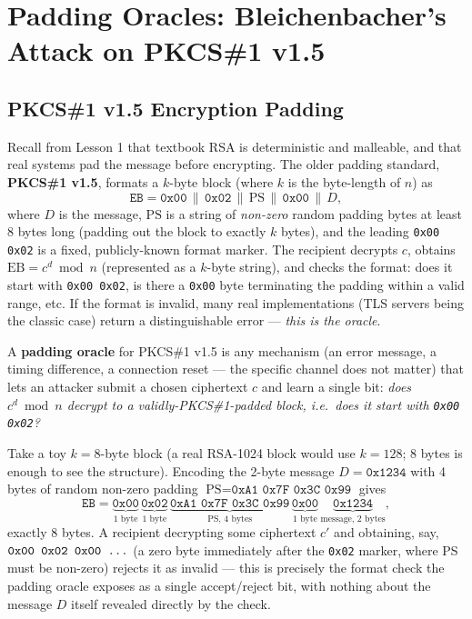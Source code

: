 \newpage
\section{Padding Oracles: Bleichenbacher's Attack on PKCS\#1 v1.5}

\subsection{PKCS\#1 v1.5 Encryption Padding}

Recall from Lesson 1 that textbook RSA is deterministic and malleable, and that real systems pad the message before encrypting. The older padding standard, \textbf{PKCS\#1 v1.5}, formats a $k$-byte block (where $k$ is the byte-length of $n$) as
\[
\texttt{EB} = \texttt{0x00} \,\|\, \texttt{0x02} \,\|\, \text{PS} \,\|\, \texttt{0x00} \,\|\, D,
\]
where $D$ is the message, $\text{PS}$ is a string of \emph{non-zero} random padding bytes at least 8 bytes long (padding out the block to exactly $k$ bytes), and the leading \texttt{0x00 0x02} is a fixed, publicly-known format marker. The recipient decrypts $c$, obtains $\text{EB} = c^d \bmod n$ (represented as a $k$-byte string), and checks the format: does it start with \texttt{0x00 0x02}, is there a \texttt{0x00} byte terminating the padding within a valid range, etc. If the format is invalid, many real implementations (TLS servers being the classic case) return a distinguishable error — \emph{this is the oracle}.

\begin{definition}
A \textbf{padding oracle} for PKCS\#1 v1.5 is any mechanism (an error message, a timing difference, a connection reset — the specific channel does not matter) that lets an attacker submit a chosen ciphertext $c$ and learn a single bit: \emph{does $c^d \bmod n$ decrypt to a validly-PKCS\#1-padded block, i.e.\ does it start with \texttt{0x00 0x02}?}
\end{definition}

\begin{example}
Take a toy $k=8$-byte block (a real RSA-1024 block would use $k=128$; 8 bytes is enough to see the structure). Encoding the 2-byte message $D = \texttt{0x1234}$ with 4 bytes of random non-zero padding $\text{PS} = \texttt{0xA1 0x7F 0x3C 0x99}$ gives
\[
\texttt{EB} = \underbrace{\texttt{0x00}}_{\text{1 byte}} \,\underbrace{\texttt{0x02}}_{\text{1 byte}} \,\underbrace{\texttt{0xA1 0x7F 0x3C 0x99}}_{\text{PS, 4 bytes}} \,\underbrace{\texttt{0x00}}_{\text{1 byte}} \,\underbrace{\texttt{0x1234}}_{\text{message, 2 bytes}},
\]
exactly 8 bytes. A recipient decrypting some ciphertext $c'$ and obtaining, say, $\texttt{0x00 0x02 0x00 \dots}$ (a zero byte immediately after the \texttt{0x02} marker, where PS must be non-zero) rejects it as invalid — this is precisely the format check the padding oracle exposes as a single accept/reject bit, with nothing about the message $D$ itself revealed directly by the check.
\end{example}

